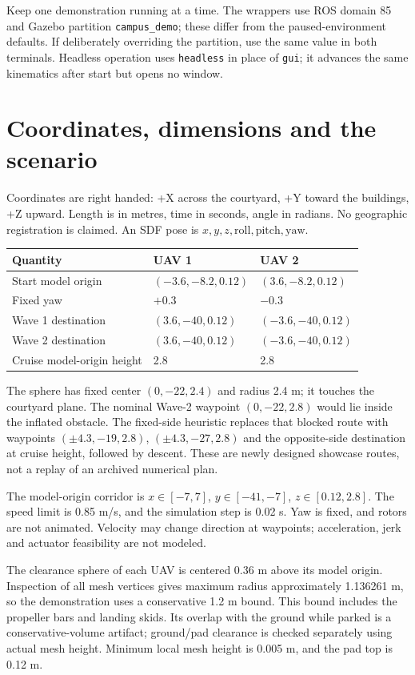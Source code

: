 Keep one demonstration running at a time. The wrappers use ROS domain 85 and Gazebo partition \texttt{campus\_demo}; these differ from the paused-environment defaults. If deliberately overriding the partition, use the same value in both terminals. Headless operation uses \texttt{headless} in place of \texttt{gui}; it advances the same kinematics after start but opens no window.

\section{Coordinates, dimensions and the scenario}
Coordinates are right handed: +X across the courtyard, +Y toward the buildings, +Z upward. Length is in metres, time in seconds, angle in radians. No geographic registration is claimed. An SDF pose is $x,y,z,\mathrm{roll},\mathrm{pitch},\mathrm{yaw}$.

\begin{center}\small
\begin{tabular}{lll}\toprule
Quantity & UAV 1 & UAV 2\\\midrule
Start model origin & $(-3.6,-8.2,0.12)$ & $(3.6,-8.2,0.12)$\\
Fixed yaw & $+0.3$ & $-0.3$\\
Wave 1 destination & $(3.6,-40,0.12)$ & $(-3.6,-40,0.12)$\\
Wave 2 destination & $(3.6,-40,0.12)$ & $(-3.6,-40,0.12)$\\
Cruise model-origin height & 2.8 & 2.8\\\bottomrule
\end{tabular}\end{center}

The sphere has fixed center $(0,-22,2.4)$ and radius 2.4 m; it touches the courtyard plane. The nominal Wave-2 waypoint $(0,-22,2.8)$ would lie inside the inflated obstacle. The fixed-side heuristic replaces that blocked route with waypoints $(\pm4.3,-19,2.8)$, $(\pm4.3,-27,2.8)$ and the opposite-side destination at cruise height, followed by descent. These are newly designed showcase routes, not a replay of an archived numerical plan.

The model-origin corridor is $x\in[-7,7]$, $y\in[-41,-7]$, $z\in[0.12,2.8]$. The speed limit is 0.85 m/s, and the simulation step is 0.02 s. Yaw is fixed, and rotors are not animated. Velocity may change direction at waypoints; acceleration, jerk and actuator feasibility are not modeled.

The clearance sphere of each UAV is centered 0.36 m above its model origin. Inspection of all mesh vertices gives maximum radius approximately 1.136261 m, so the demonstration uses a conservative 1.2 m bound. This bound includes the propeller bars and landing skids. Its overlap with the ground while parked is a conservative-volume artifact; ground/pad clearance is checked separately using actual mesh height. Minimum local mesh height is 0.005 m, and the pad top is 0.12 m.

